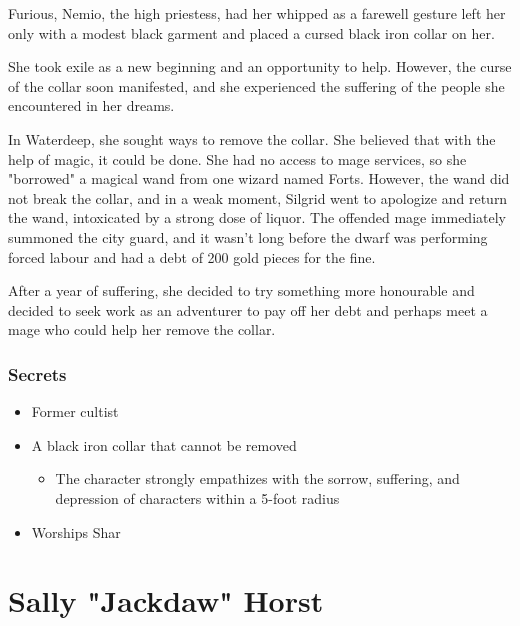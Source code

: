 \documentclass[10pt,onecolumn,twoside,openany,bg=full,layout=true]{dndbook}
\begin{document}
Furious, Nemio, the high priestess, had her whipped as a farewell gesture left her only with a modest black garment
and placed a cursed black iron collar on her.

She took exile as a new beginning and an opportunity to help.
However, the curse of the collar soon manifested, and she experienced the suffering of the people she encountered in her dreams.

In Waterdeep, she sought ways to remove the collar.
She believed that with the help of magic, it could be done.
She had no access to mage services, so she "borrowed" a magical wand from one wizard named Forts.
However, the wand did not break the collar, and in a weak moment, Silgrid went to apologize and return the wand,
intoxicated by a strong dose of liquor.
The offended mage immediately summoned the city guard, and it wasn't long before the dwarf was performing forced labour
and had a debt of 200 gold pieces for the fine.

After a year of suffering, she decided to try something more honourable and decided to seek work as an adventurer
to pay off her debt and perhaps meet a mage who could help her remove the collar.

\subsubsection{Secrets}
\begin{itemize}
  \item Former cultist
  \item A black iron collar that cannot be removed
  \begin{itemize}
    \item The character strongly empathizes with the sorrow, suffering, and depression of characters within a 5-foot radius
  \end{itemize}
\item Worships Shar
\end{itemize}

\vfill
\pagebreak


  \section{Sally "Jackdaw" Horst}\label{sec:sally-jackdaw-horst}
\end{document}
